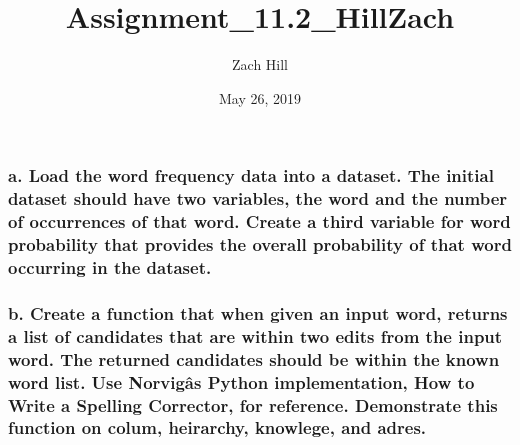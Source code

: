 \documentclass[]{article}
\title{Assignment\_11.2\_HillZach}
\author{Zach Hill}
\date{May 26, 2019}
\newenvironment{Shaded}{\begin{snugshade}}{\end{snugshade}}
\newcommand{\DataTypeTok}[1]{\textcolor[rgb]{0.13,0.29,0.53}{#1}}
\newcommand{\KeywordTok}[1]{\textcolor[rgb]{0.13,0.29,0.53}{\textbf{#1}}}
\newcommand{\NormalTok}[1]{#1}
\newcommand{\OperatorTok}[1]{\textcolor[rgb]{0.81,0.36,0.00}{\textbf{#1}}}
\newcommand{\StringTok}[1]{\textcolor[rgb]{0.31,0.60,0.02}{#1}}
\begin{document}
\maketitle

\hypertarget{a.-load-the-word-frequency-data-into-a-dataset.-the-initial-dataset-should-have-two-variables-the-word-and-the-number-of-occurrences-of-that-word.-create-a-third-variable-for-word-probability-that-provides-the-overall-probability-of-that-word-occurring-in-the-dataset.}{%
\subsubsection{a. Load the word frequency data into a dataset. The
initial dataset should have two variables, the word and the number of
occurrences of that word. Create a third variable for word probability
that provides the overall probability of that word occurring in the
dataset.}\label{a.-load-the-word-frequency-data-into-a-dataset.-the-initial-dataset-should-have-two-variables-the-word-and-the-number-of-occurrences-of-that-word.-create-a-third-variable-for-word-probability-that-provides-the-overall-probability-of-that-word-occurring-in-the-dataset.}}

\begin{Shaded}
\end{Shaded}

\hypertarget{b.-create-a-function-that-when-given-an-input-word-returns-a-list-of-candidates-that-are-within-two-edits-from-the-input-word.-the-returned-candidates-should-be-within-the-known-word-list.-use-norvigas-python-implementation-how-to-write-a-spelling-corrector-for-reference.-demonstrate-this-function-on-colum-heirarchy-knowlege-and-adres.}{%
\subsubsection{b. Create a function that when given an input word,
returns a list of candidates that are within two edits from the input
word. The returned candidates should be within the known word list. Use
Norvigâs Python implementation, How to Write a Spelling Corrector, for
reference. Demonstrate this function on colum, heirarchy, knowlege, and
adres.}\label{b.-create-a-function-that-when-given-an-input-word-returns-a-list-of-candidates-that-are-within-two-edits-from-the-input-word.-the-returned-candidates-should-be-within-the-known-word-list.-use-norvigas-python-implementation-how-to-write-a-spelling-corrector-for-reference.-demonstrate-this-function-on-colum-heirarchy-knowlege-and-adres.}}
\end{document}
